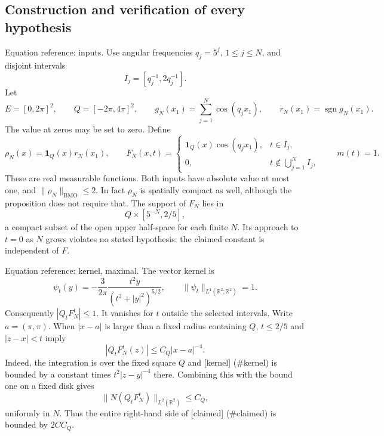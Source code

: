\documentclass[10pt]{article}
\begin{document}
\subsection*{Construction and verification of every hypothesis}
Equation reference: inputs. Use angular frequencies \(q_j=5^j\), \(1\le j\le N\), and disjoint intervals \[I_j=[q_j^{-1},2q_j^{-1}].\] Let \[E=[0,2\pi]^2,\qquad Q=[-2\pi,4\pi]^2,\qquad
 g_N(x_1)=\sum_{j=1}^N\cos(q_jx_1),\qquad
 r_N(x_1)=\operatorname{sgn}g_N(x_1).\] The value at zeros may be set to zero. Define \[
 \rho_N(x)=\mathbf1_Q(x)r_N(x_1),\qquad
 F_N(x,t)=
 \begin{cases}
 \mathbf1_Q(x)\cos(q_jx_1),&t\in I_j,\\
 0,&t\notin\bigcup_{j=1}^NI_j,
 \end{cases}
 \qquad m(t)=1.\] These are real measurable functions. Both inputs have absolute value at most one, and \(\|\rho_N\|_{\mathrm{BMO}}\le2\). In fact \(\rho_N\) is spatially compact as well, although the proposition does not require that. The support of \(F_N\) lies in \[Q\times[5^{-N},2/5],\] a compact subset of the open upper half-space for each finite \(N\). Its approach to \(t=0\) as \(N\) grows violates no stated hypothesis: the claimed constant is independent of \(F\).\par
Equation reference: kernel, maximal. The vector kernel is \[
 \psi_t(y)=-\frac{3}{2\pi}\frac{t^2y}{(t^2+|y|^2)^{5/2}},
 \qquad \|\psi_t\|_{L^1(\mathbb R^2;\mathbb R^2)}=1.\] Consequently \(|Q_tF_N^t|\le1\). It vanishes for \(t\) outside the selected intervals. Write \(a=(\pi,\pi)\). When \(|x-a|\) is larger than a fixed radius containing \(Q\), \(t\le2/5\) and \(|z-x|<t\) imply \[|Q_tF_N^t(z)|\le C_Q|x-a|^{-4}.\] Indeed, the integration is over the fixed square \(Q\) and [kernel] (\#kernel) is bounded by a constant times \(t^2|z-y|^{-4}\) there. Combining this with the bound one on a fixed disk gives \[
 \|N(Q_tF_N^t)\|_{L^2(\mathbb R^2)}\le C_Q,\] uniformly in \(N\). Thus the entire right-hand side of [claimed] (\#claimed) is bounded by \(2CC_Q\).\par
\end{document}
